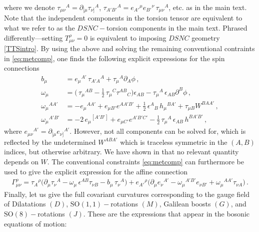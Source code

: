 \documentclass[a4paper,10pt,openany]{article}
\begin{document}
	where we denote $\tau_{\mu\nu}{}^A=\partial_{[\mu}\tau_{\nu]}{}^A$, $\tau_{A'B'}{}^A=e_{A'}{}^\mu e_{B'}{}^\nu\,\tau_{\mu\nu}{}^A$, etc. as in the main text. Note that the independent components in the torsion tensor are equivalent to what we refer to as the $DSNC-$torsion components in the main text. Phrased differently---setting $T_{\mu\nu}^\rho=0$ is equivalent to imposing $DSNC$ geometry \eqref{TTSintro}. By using the above and solving the remaining conventional contraints in \eqref{eq:metcomp}, one finds the following explicit expressions for the spin connections
	\begin{subequations}\label{eq:galspinconn}
		\begin{align}
			b_\mu &= e_\mu{}^{A'}\,\tau_{A'A}{}^A +\tau_\mu{}^A\partial_A\phi \,,\\
			\omega_\mu &= \big(\,\tau_\mu{}^{AB}-\frac12\,\tau_\mu{}^C\tau^{AB}{}_C \big)\epsilon_{AB} - \tau_\mu{}^A\,\epsilon_{AB}\partial^B\phi\,,\\
			\omega_\mu{}^{AA'} &= -e_\mu{}^{AA'}+e_{\mu B'}e^{AA'B'} + \frac12\,\epsilon^A{}_B\,h_\mu{}^{BA'}  + \tau_{\mu B} W^{BAA'} \,,\\
			\omega_\mu{}^{A'B'} &= -2\, e_{\mu}{}^{[A'B']}+e_{\mu C'}e^{A'B'C'} - \frac12\,\tau_\mu{}^A\,\epsilon_{AB}\,h^{BA'B'} \,,
		\end{align}
	\end{subequations}
	where $e_{\mu\nu}{}^{A'} = \partial_{[\mu} e_{\nu]}{}^{A'}$. However, not all components can be solved for, which is reflected by the undetermined $W^{ABA'}$ which is traceless symmetric in the $(A,B)$ indices, but otherwise arbitrary. We have shown in \cite{Bergshoeff:2021bmc} that no relevant quantity depends on $W$. The conventional constraints \eqref{eq:metcomp} can furthermore be used to give the explicit expression for the affine connection
	\begin{align}
		\Gamma_{\mu\nu}^\rho = \tau_A{}^\rho \big( \partial_\mu\tau_\nu{}^A - \omega_\mu\,\epsilon^{AB}\tau_{\nu B} - b_\mu\,\tau_\nu{}^A\big) + e_{A'}{}^\rho \big(\partial_\mu e_\nu{}^{A'} - \omega_\mu{}^{A'B'} e_{\nu B'} + \omega_\mu{}^{AA'}\tau_{\nu A}\big)\,.
	\end{align}
	Finally, let us give the full covariant curvatures corresponding to the gauge field of Dilatations $(D)$, $\mathrm{SO}(1,1)-$rotations $(M)$, Galilean boosts $(G)$, and $\mathrm{SO}(8)-$rotations $(J)$. These are the expressions that appear in the bosonic equations of motion:
\end{document}
